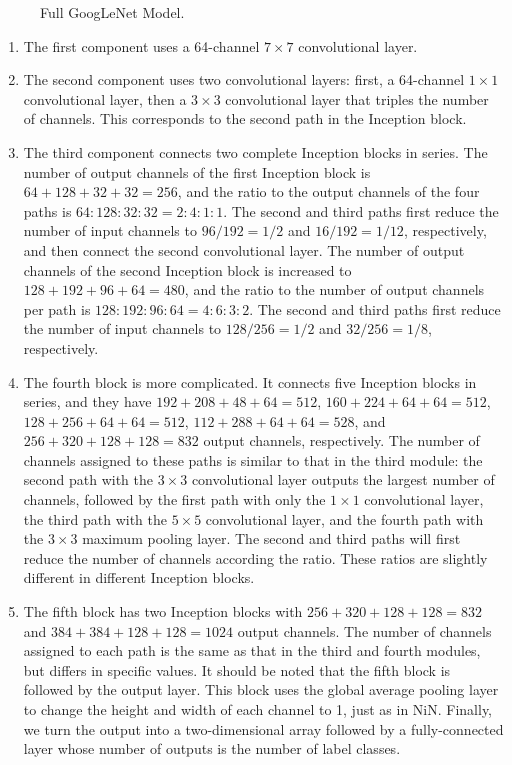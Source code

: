 \begin{figure}[hpt]
	\centering
	
	\caption{Full GoogLeNet Model.}
	\label{fig:inception-full}
\end{figure}

\begin{enumerate}
    \item The first component uses a 64-channel $7 \times 7$ convolutional layer.
    \item The second component uses two convolutional layers: first, a 64-channel $1\times 1$ convolutional layer, then a $3\times 3$ convolutional layer that triples the number of channels. This corresponds to the second path in the Inception block.
    \item The third component connects two complete Inception blocks in series. The number of output channels of the first Inception block is $64+128+32+32=256$, and the ratio to the output channels of the four paths is $64:128:32:32=2:4:1:1$. The second and third paths first reduce the number of input channels to $96/192=1/2$ and $16/192=1/12$, respectively, and then connect the second convolutional layer. The number of output channels of the second Inception block is increased to $128+192+96+64=480$, and the ratio to the number of output channels per path is $128:192:96:64 = 4:6:3:2$. The second and third paths first reduce the number of input channels to $128/256=1/2$ and $32/256=1/8$, respectively.
    \item The fourth block is more complicated. It connects five Inception blocks in series, and they have $192+208+48+64=512$, $160+224+64+64=512$, $128+256+64+64=512$, $112+288+64+64=528$, and $256+320+128+128=832$ output channels, respectively. The number of channels assigned to these paths is similar to that in the third module: the second path with the $3\times 3$ convolutional layer outputs the largest number of channels, followed by the first path with only the $1\times 1$ convolutional layer, the third path with the $5\times 5$ convolutional layer, and the fourth path with the $3\times 3$ maximum pooling layer. The second and third paths will first reduce the number of channels according the ratio. These ratios are slightly different in different Inception blocks.
    \item The fifth block has two Inception blocks with $256+320+128+128=832$ and $384+384+128+128=1024$ output channels. The number of channels assigned to each path is the same as that in the third and fourth modules, but differs in specific values. It should be noted that the fifth block is followed by the output layer. This block uses the global average pooling layer to change the height and width of each channel to 1, just as in NiN. Finally, we turn the output into a two-dimensional array followed by a fully-connected layer whose number of outputs is the number of label classes.
\end{enumerate}
 
